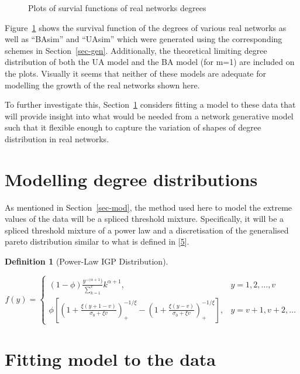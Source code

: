 \documentclass[
  10pt,
  a4paper,
]{scrreprt}
\theoremstyle{plain}
\theoremstyle{plain}
\theoremstyle{definition}
\newtheorem{definition}{Definition}[section]
\theoremstyle{plain}
\theoremstyle{remark}
\begin{document}
{\begin{figure}[H]
{}

\caption{\label{fig-survs}Plots of survial functions of real networks
degrees}

\end{figure}

Figure~\ref{fig-survs} shows the survival function of the degrees of
various real networks as well as ``BAsim'' and ``UAsim'' which were
generated using the corresponding schemes in Section~\ref{sec-gen}.
Additionally, the theoretical limiting degree distribution of both the
UA model and the BA model (for m=1) are included on the plots. Visually
it seems that neither of these models are adequate for modelling the
growth of the real networks shown here.

To further investigate this, Section~\ref{sec-realmodel} considers
fitting a model to these data that will provide insight into what would
be needed from a network generative model such that it flexible enough
to capture the variation of shapes of degree distribution in real
networks.

\hypertarget{sec-realmodel}{%
\section{Modelling degree distributions}\label{sec-realmodel}}

As mentioned in Section~\ref{sec-mod}, the method used here to model the
extreme values of the data will be a spliced threshold mixture.
Specifically, it will be a spliced threshold mixture of a power law and
a discretisation of the generalised pareto distribution similar to what
is defined in {[}\protect\hyperlink{ref-Rohrbeck_2018}{5}{]}.

\begin{definition}[Power-Law IGP
Distribution]\protect\hypertarget{def-pligp}{}\label{def-pligp}

\[
f(y) = \begin{cases}
(1-\phi)\displaystyle\frac{y^{-(\alpha+1})}{\sum_{k=1}^v}k^{\alpha+1}, & y=1,2,\ldots, v\\
\phi\left[\left(1+\displaystyle\frac{\xi(y+1-v)}{\sigma_0+\xi v}\right)_+^{-1/\xi}-\left(1+\displaystyle\frac{\xi(y-v)}{\sigma_0+\xi v}\right)_+^{-1/\xi}\right],&y=v+1, v+2,\ldots
\end{cases}
\]

\end{definition}

\hypertarget{fitting-model-to-the-data}{%
\section{Fitting model to the data}\label{fitting-model-to-the-data}}

}
\end{document}
